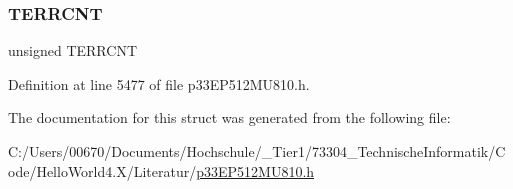 \subsubsection{\texorpdfstring{T\+E\+R\+R\+C\+NT}{TERRCNT}}
{\footnotesize\ttfamily unsigned T\+E\+R\+R\+C\+NT}



Definition at line 5477 of file p33\+E\+P512\+M\+U810.\+h.



The documentation for this struct was generated from the following file\+:\begin{DoxyCompactItemize}
\item 
C\+:/\+Users/00670/\+Documents/\+Hochschule/\+\_\+\+Tier1/73304\+\_\+\+Technische\+Informatik/\+Code/\+Hello\+World4.\+X/\+Literatur/\hyperlink{p33_e_p512_m_u810_8h}{p33\+E\+P512\+M\+U810.\+h}\end{DoxyCompactItemize}
